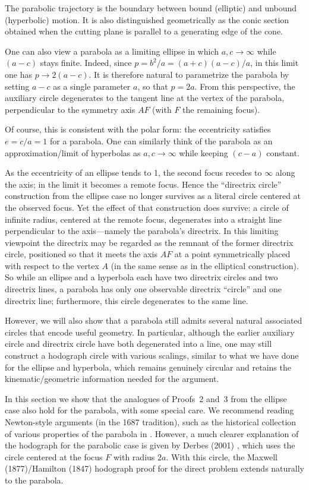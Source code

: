 The parabolic trajectory is the boundary between bound (elliptic) and unbound (hyperbolic) motion.
It is also distinguished geometrically as the conic section obtained when the cutting plane is parallel to a generating edge of the cone.

One can also view a parabola as a limiting ellipse in which $a,c\to\infty$ while $(a\!-\!c)$ stays finite.
Indeed, since $p=b^2/a=(a+c)(a-c)/a$, in this limit one has $p\to 2(a-c)$.
It is therefore natural to parametrize the parabola by setting $a-c$ as a single parameter $a$, so that $p=2a$. From this perspective, the auxiliary circle degenerates to the tangent line at the vertex of the parabola, perpendicular to the symmetry axis $AF$ (with $F$ the remaining focus).

Of course, this is consistent with the polar form: the eccentricity satisfies $e=c/a=1$ for a parabola. One can similarly think of the parabola as an approximation/limit of hyperbolas as $a,c\to \infty$ while keeping $(c\!-a)$ constant.

As the eccentricity of an ellipse tends to 1, the second focus recedes to $\infty$ along the axis; in the limit it becomes a remote focus. Hence the “directrix circle” construction from the ellipse case no longer survives as a literal circle centered at the observed focus.
Yet the effect of that construction does survive: a circle of infinite radius, centered at the remote focus, degenerates into a straight line perpendicular to the axis—namely the parabola’s directrix. In this limiting viewpoint the directrix may be regarded as the remnant of the former directrix circle, positioned so that it meets the axis
$AF$ at a point symmetrically placed with respect to the vertex
$A$ (in the same sense as in the elliptical construction). So while an ellipse and a hyperbola each have two directrix circles and two directrix lines, a parabola has only one observable directrix ``circle'' and one directrix line; furthermore, this circle degenerates to the same line.

However, we will also show that a parabola still admits several natural associated circles that encode useful geometry. In particular, although the earlier auxiliary circle and directrix circle have both degenerated into a line, one may still construct a hodograph circle with various scalings, similar to what we have done for the ellipse and hyperbola, which remains genuinely circular and retains the kinematic/geometric information needed for the argument.

In this section we show that the analogues of Proofs~2 and~3 from the ellipse case also hold for the parabola, with some special care.
We recommend reading Newton-style arguments (in the 1687 tradition), such as the historical collection of various properties of the parabola in \href{https://doi.org/10.5539/apr.v11n2p30}{\cite{stavek2019newtonsparabola}}.
However, a much clearer explanation of the hodograph for the parabolic case is given by Derbes (2001) \cite{derbes2001reinventing}, which uses the circle centered at the focus $F$ with radius $2a$.
With this circle, the Maxwell (1877)/Hamilton (1847) hodograph proof for the direct problem extends naturally to the parabola.

